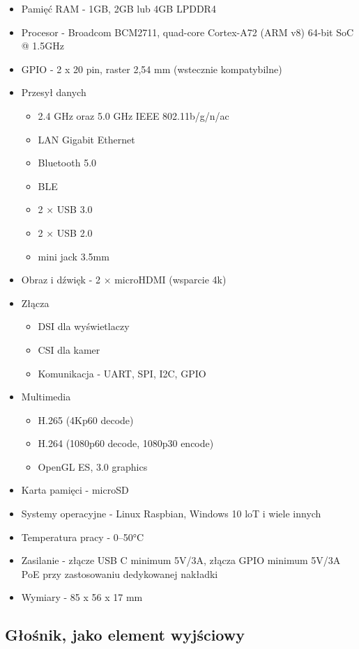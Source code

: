 \documentclass[a4paper,12pt,reqno]{article}
\begin{document}
\begin{itemize}
	\item Pamięć RAM - 1GB, 2GB lub 4GB LPDDR4
	\item Procesor - Broadcom BCM2711, quad-core Cortex-A72 (ARM v8) 64-bit SoC @ 1.5GHz
	\item GPIO - 2 x 20 pin, raster 2,54 mm (wstecznie kompatybilne)
	\item Przesył danych
		\begin{itemize}
			\item 2.4 GHz oraz 5.0 GHz IEEE 802.11b/g/n/ac
			\item LAN Gigabit Ethernet
			\item Bluetooth 5.0
			\item BLE
			\item 2 × USB 3.0
			\item 2 × USB 2.0
			\item mini jack 3.5mm
		\end{itemize}
	\item Obraz i dźwięk - 2 × microHDMI (wsparcie 4k)
	\item Złącza
		\begin{itemize}
			\item DSI dla wyświetlaczy
			\item CSI dla kamer
			\item Komunikacja - UART, SPI, I2C, GPIO
		\end{itemize}
	\item Multimedia
		\begin{itemize}
			\item H.265 (4Kp60 decode)
			\item H.264 (1080p60 decode, 1080p30 encode)
			\item OpenGL ES, 3.0 graphics
		\end{itemize}
	\item Karta pamięci - microSD
	\item Systemy operacyjne - Linux Raspbian, Windows 10 loT i wiele innych
	\item Temperatura pracy - 0–50°C
	\item Zasilanie - złącze USB C minimum 5V/3A, złącza GPIO minimum 5V/3A
PoE przy zastosowaniu dedykowanej nakładki
	\item Wymiary - 85 x 56 x 17 mm
\end{itemize}

\subsection{Głośnik, jako element wyjściowy}
\end{document}
